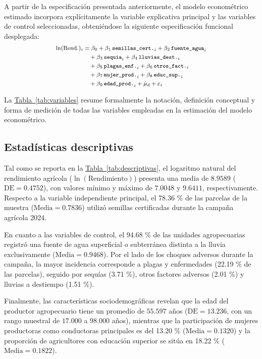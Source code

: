 \documentclass[11pt,a4paper,twocolumn]{article}
\begin{document}
A partir de la especificación presentada anteriormente, el modelo econométrico estimado incorpora explícitamente la variable explicativa principal y las variables de control seleccionadas, obteniéndose la siguiente especificación funcional desplegada:
\begin{equation}
\footnotesize
\begin{split}
    \ln(\text{Rend.})_i &= \beta_0 + \beta_1\,\texttt{semillas\_cert.}_i + \beta_2\,\texttt{fuente\_agua}_i \\
    &\quad + \beta_3\,\texttt{sequia}_i + \beta_4\,\texttt{lluvias\_dest.}_i \\
    &\quad + \beta_5\,\texttt{plagas\_enf.}_i + \beta_6\,\texttt{otros\_fact.}_i \\
    &\quad + \beta_7\,\texttt{mujer\_prod.}_i + \beta_8\,\texttt{educ\_sup.}_i \\
    &\quad + \beta_9\,\texttt{edad\_prod.}_i + \hat{\mu}_d + \varepsilon_i
\end{split}
\end{equation}


La \hyperref[tab:variables]{Tabla~\ref*{tab:variables}} resume formalmente la notación, definición conceptual y forma de medición de todas las variables empleadas en la estimación del modelo econométrico.

\subsection{Estadísticas descriptivas}
Tal como se reporta en la \hyperref[tab:descriptivas]{Tabla~\ref*{tab:descriptivas}}, el logaritmo natural del rendimiento agrícola ($\ln(\text{Rendimiento})$) presenta una media de $8.9589$ ($\text{DE} = 0.4752$), con valores mínimo y máximo de $7.0048$ y $9.6411$, respectivamente. Respecto a la variable independiente principal, el 78.36 \% de las parcelas de la muestra ($\text{Media} = 0.7836$) utilizó semillas certificadas durante la campaña agrícola 2024.

En cuanto a las variables de control, el 94.68 \% de las unidades agropecuarias registró una fuente de agua superficial o subterránea distinta a la lluvia exclusivamente ($\text{Media} = 0.9468$). Por el lado de los choques adversos durante la campaña, la mayor incidencia corresponde a plagas y enfermedades (22.19 \% de las parcelas), seguido por sequías (3.71 \%), otros factores adversos (2.01 \%) y lluvias a destiempo (1.51 \%). 

Finalmente, las características sociodemográficas revelan que la edad del productor agropecuario tiene un promedio de $55.597$ años ($\text{DE} = 13.236$, con un rango muestral de $17.000$ a $98.000$ años), mientras que la participación de mujeres productoras como conductoras principales es del 13.20 \% ($\text{Media} = 0.1320$) y la proporción de agricultores con educación superior se sitúa en 18.22 \% ($\text{Media} = 0.1822$).
\end{document}
